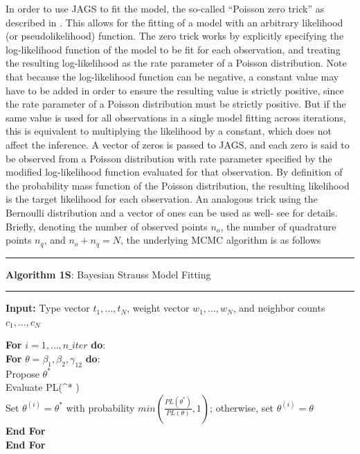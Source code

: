 \documentclass[
]{book}
\begin{document}
In order to use JAGS to fit the model, the so-called ``Poisson zero trick'' as described in \citet{Kruschke14}. This allows for the fitting of a model with an arbitrary likelihood (or pseudolikelihood) function. The zero trick works by explicitly specifying the log-likelihood function of the model to be fit for each observation, and treating the resulting log-likelihood as the rate parameter of a Poisson distribution. Note that because the log-likelihood function can be negative, a constant value may have to be added in order to ensure the resulting value is strictly positive, since the rate parameter of a Poisson distribution must be strictly positive. But if the same value is used for all observations in a single model fitting across iterations, this is equivalent to multiplying the likelihood by a constant, which does not affect the inference. A vector of zeros is passed to JAGS, and each zero is said to be observed from a Poisson distribution with rate parameter specified by the modified log-likelihood function evaluated for that observation. By definition of the probability mass function of the Poisson distribution, the resulting likelihood is the target likelihood for each observation. An analogous trick using the Bernoulli distribution and a vector of ones can be used as well- see \citet{Kruschke14} for details. Briefly, denoting the number of observed points \(n_o\), the number of quadrature points \(n_q\), and \(n_o + n_q = N\), the underlying MCMC algorithm is as follows

\begin{center}\rule{0.5\linewidth}{0.5pt}\end{center}

\textbf{Algorithm 1S}: Bayesian Strauss Model Fitting

\begin{center}\rule{0.5\linewidth}{0.5pt}\end{center}

\textbf{Input:} Type vector \(t_1, \dots, t_N\), weight vector \(w_1, \dots, w_N\), and neighbor counts \(c_1, \dots, c_N\)

\textbf{For} \(i = 1, \dots, n\_iter\) \textbf{do}:\\
\textbar{} \textbf{For} \(\theta = \beta_1, \beta_2, \gamma_{12}\) \textbf{do}:\\
\textbar{} \textbar{} Propose \(\theta^*\)\\
\textbar{} \textbar{} Evaluate PL(\theta\^{}* \textbar{} \cdot )\\
\textbar{} \textbar{} Set \(\theta^{(i)} = \theta^*\) with probability \(min(\frac{PL(\theta^*)}{PL(\theta)}, 1)\); otherwise, set \(\theta^{(i)} = \theta\)\\
\textbar{} \textbf{End For}\\
\textbf{End For}
\end{document}
